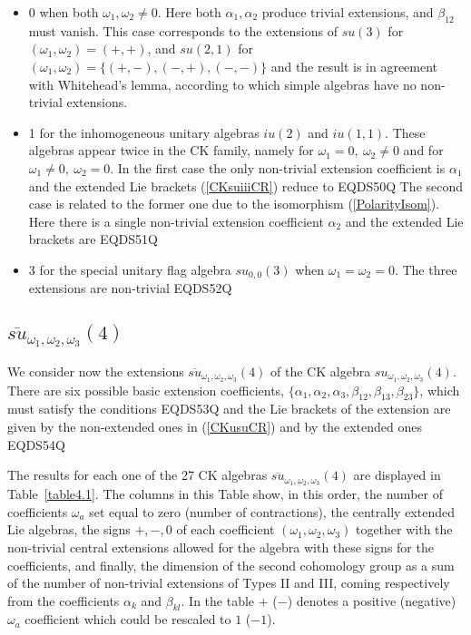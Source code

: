 \documentclass[12pt]{article}
\begin{document}
\begin{itemize}
\item
0 when both ${\omega}_1,{\omega}_2\ne 0$. Here both
${\alpha}_{1}, {\alpha}_{2}$ produce trivial extensions, and ${\beta}_{12}$
must vanish. This case corresponds to the extensions of ${su}(3)$ for
$({\omega}_1,{\omega}_2)=(+,+)$,  and  ${su}({2,1})$ for
$({\omega}_1,{\omega}_2)=\{(+,-),(-,+),(-,-)\}$ and the result is in agreement
with Whitehead's lemma, according to which simple algebras have no
non-trivial extensions.

\item
1 for the inhomogeneous unitary algebras ${iu}(2)$ and
${iu}({1,1})$. These algebras appear twice in the CK family, namely
for ${\omega}_1= 0,\ {\omega}_2 \neq 0$ and for ${\omega}_1\neq 0,\ {\omega}_2=0$. In the
first case the only non-trivial extension coefficient is
${\alpha}_{1}$ and the extended Lie brackets (\ref{CKsuiiiCR}) reduce to
EQDS50Q
The second case  is related to the former one due to the isomorphism
(\ref{PolarityIsom}). Here there is a single non-trivial extension
coefficient ${\alpha}_{2}$ and the extended Lie brackets are
EQDS51Q

\item
3 for the special unitary flag algebra ${su}_{0,0}(3)$
when ${\omega}_1={\omega}_2= 0$. The three extensions are  non-trivial
EQDS52Q
\end{itemize}

\subsection{$\overline{su}_{{\omega}_1,{\omega}_2, {\omega}_3}(4)$ }

We consider now the extensions $\overline{su}_{{\omega}_1,{\omega}_2,{\omega}_3}(4)$ of
the CK algebra ${su}_{{\omega}_1,{\omega}_2,{\omega}_3}(4)$. There are six possible
basic extension coefficients, $\{{\alpha}_{1},{\alpha}_{2},{\alpha}_{3},
{\beta}_{12},{\beta}_{13},{\beta}_{23}\}$, which must satisfy the
conditions
EQDS53Q
and the Lie brackets of the extension are given by the non-extended
ones in (\ref{CKusuCR}) and by the extended ones
EQDS54Q

The results for each one of the 27 CK algebras
$\overline{su}_{{\omega}_1,{\omega}_2,{\omega}_3}(4)$ are displayed in Table~\ref{table4.1}.
The columns in this Table show, in this order, the number of coefficients
${\omega}_a$ set equal to zero (number of contractions), the centrally
extended Lie algebras, the signs $+, -, 0$ of each
coefficient $({\omega}_1,{\omega}_2,{\omega}_3)$  together with the  non-trivial central
extensions  allowed for the algebra with these signs for the coefficients,
and finally, the dimension of the second cohomology group as a sum of
the number of non-trivial extensions of Types II and III, coming
respectively from the coefficients ${\alpha}_{k}$ and ${\beta}_{kl}$. In the
table $+$ ($-$) denotes a positive (negative) ${\omega}_a$ coefficient which could be
rescaled to $1$ ($-1$).
\end{document}
